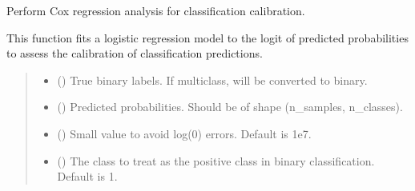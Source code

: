 \documentclass[letterpaper,10pt,english]{sphinxmanual}
\begin{document}
\begin{fulllineitems}
\label{\detokenize{calzone:calzone.metrics.cox_regression_analysis}}
\pysigstartsignatures
{}
\pysigstopsignatures
\sphinxAtStartPar
Perform Cox regression analysis for classification calibration.

\sphinxAtStartPar
This function fits a logistic regression model to the logit of predicted probabilities
to assess the calibration of classification predictions.
\begin{quote}\begin{description}
\begin{itemize}
\item {} 
\sphinxAtStartPar
{} () \textendash{} True binary labels. If multi\sphinxhyphen{}class, will be converted to binary.

\item {} 
\sphinxAtStartPar
{} () \textendash{} Predicted probabilities. Should be of shape (n\_samples, n\_classes).

\item {} 
\sphinxAtStartPar
{} () \textendash{} Small value to avoid log(0) errors. Default is 1e\sphinxhyphen{}7.

\item {} 
\sphinxAtStartPar
{} () \textendash{} The class to treat as the positive class in binary classification. Default is 1.


\end{itemize}
\end{description}
\end{quote}
\end{fulllineitems}
\end{document}
